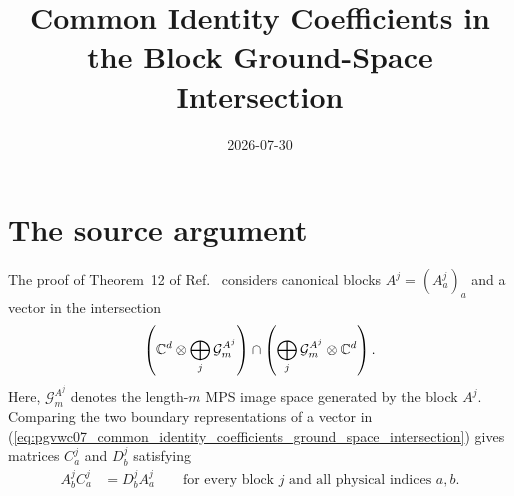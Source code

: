 \documentclass{article}
\title{Common Identity Coefficients in the Block Ground-Space Intersection}
\author{}
\date{2026-07-30}
\begin{document}
\maketitle
{}

\section{The source argument}

The proof of Theorem~12 of
Ref.~\cite[lines~1424--1456]{PerezGarcia2007Matrix} considers canonical
blocks $A^j=(A_a^j)_a$ and a vector in the intersection
\begin{align}
    \left(\mathbb{C}^d\otimes\bigoplus_j\mathcal G_m^{A^j}\right)
    \cap
    \left(\bigoplus_j\mathcal G_m^{A^j}\otimes\mathbb{C}^d\right).
    \label{eq:pgvwc07_common_identity_coefficients_ground_space_intersection}
\end{align}
Here, $\mathcal G_m^{A^j}$ denotes the length-$m$ MPS image space generated by
the block $A^j$. Comparing the two boundary representations of a vector in
(\ref{eq:pgvwc07_common_identity_coefficients_ground_space_intersection})
gives matrices $C_a^j$ and $D_b^j$ satisfying
\begin{align}
    A_b^j C_a^j
        &= D_b^j A_a^j
        \qquad\text{for every block $j$ and all physical indices $a,b$.}
    \label{eq:pgvwc07_common_identity_coefficients_boundary_intertwining}
\end{align}
\end{document}
